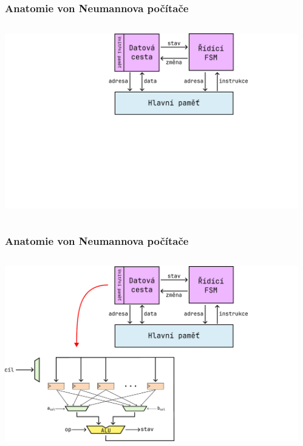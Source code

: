 \documentclass[aspectratio=169,11pt,svgnames,handout]{beamer}
\begin{document}
\begin{frame}
 \frametitle{Anatomie von Neumannova počítače}
 \begin{columns}[T]
  \begin{column}{.6\textwidth}
   \vspace*{-1em}
   \begin{center}
    \includegraphics[width=1.2\textwidth]{anatomy-1.pdf}
   \end{center}
  \end{column}
  \begin{column}{.39\textwidth}
  \end{column}
 \end{columns}
\end{frame}

\begin{frame}
 \frametitle{Anatomie von Neumannova počítače}
 \begin{columns}[T]
  \begin{column}{.6\textwidth}
   \vspace*{-1em}
   \begin{center}
    \includegraphics[width=1.2\textwidth]{anatomy-2.pdf}
   \end{center}
  \end{column}
  \begin{column}{.39\textwidth}
  \end{column}
 \end{columns}
\end{frame}
\end{document}
